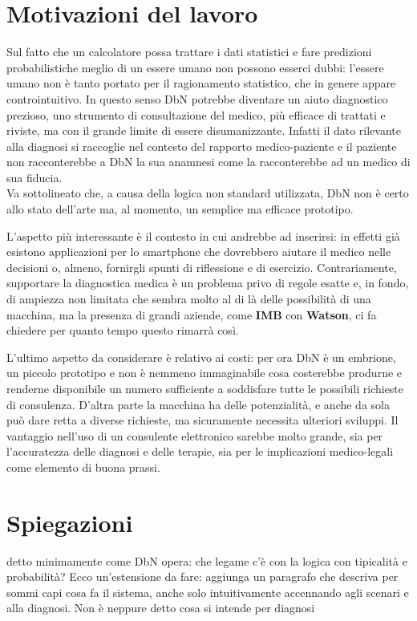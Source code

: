 \section{Motivazioni del lavoro}
Sul fatto che un calcolatore possa trattare i dati statistici e fare predizioni probabilistiche meglio di un essere umano non possono esserci dubbi:
l’essere umano non è tanto portato per il ragionamento statistico, che in genere appare controintuitivo. 
In questo senso DbN potrebbe diventare un aiuto diagnostico prezioso, uno strumento di consultazione del medico, più efficace di trattati e riviste, ma con il grande limite di essere disumanizzante. Infatti il dato rilevante alla diagnosi si raccoglie nel contesto del rapporto medico-paziente e il paziente non racconterebbe a DbN la sua anamnesi come la racconterebbe ad un medico di sua fiducia.\\ 
Va sottolineato che, a causa della logica non standard  utilizzata, DbN non è certo allo stato dell'arte ma, al momento, un semplice ma efficace prototipo.

L’aspetto più interessante è il contesto in cui andrebbe ad inserirsi: in effetti già esistono applicazioni per lo smartphone che dovrebbero aiutare il medico nelle decisioni o, almeno, fornirgli spunti di riflessione e di esercizio. Contrariamente, supportare la diagnostica medica è un problema privo di regole esatte e, in fondo, di ampiezza non limitata che sembra molto al di là delle possibilità di una macchina, ma la presenza di grandi aziende, come \textbf{IMB} con \textbf{Watson}, ci fa chiedere per quanto tempo questo rimarrà così.

L’ultimo aspetto da considerare è relativo ai costi: per ora DbN è un embrione, un piccolo prototipo e non è nemmeno immaginabile cosa costerebbe produrne e renderne disponibile un numero sufficiente a soddisfare tutte le possibili richieste di consulenza. D’altra parte la macchina ha delle potenzialità, e anche da sola può dare retta a diverse richieste, ma sicuramente necessita ulteriori sviluppi.
Il vantaggio nell'uso di un consulente elettronico sarebbe molto grande, sia per l’accuratezza delle diagnosi e delle terapie, sia per le implicazioni medico-legali come elemento di buona prassi.

\section{Spiegazioni}

detto minimamente come DbN opera: che legame c'è con la logica con tipicalità e probabilità? Ecco un'estensione da fare: aggiunga un paragrafo che descriva per sommi capi cosa fa il sistema, anche solo intuitivamente accennando agli scenari e alla diagnosi. Non è neppure detto cosa si intende per diagnosi




